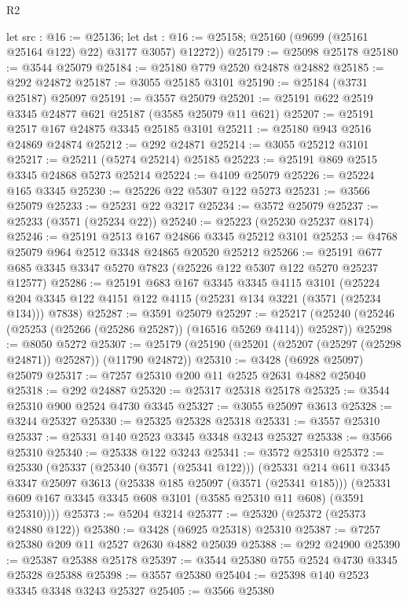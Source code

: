 \begin{lexlean}{R2}
\begin{coremodule}
        let src : @16 := @25136;
        let dst : @16 := @25158; @25160 (@9699 (@25161 @25164 @122) @22) @3177 @3057)
        @12272))
@25179 := @25098 @25178
@25180 := @3544 @25079
@25184 := @25180 @779 @2520 @24878 @24882
@25185 := @292 @24872
@25187 := @3055 @25185 @3101
@25190 := @25184 (@3731 @25187) @25097
@25191 := @3557 @25079
@25201 := @25191 @622 @2519 @3345 @24877 @621 @25187 (@3585 @25079 @11 @621)
@25207 := @25191 @2517 @167 @24875 @3345 @25185 @3101
@25211 := @25180 @943 @2516 @24869 @24874
@25212 := @292 @24871
@25214 := @3055 @25212 @3101
@25217 := @25211 (@5274 @25214) @25185
@25223 := @25191 @869 @2515 @3345 @24868 @5273 @25214
@25224 := @4109 @25079
@25226 := @25224 @165 @3345
@25230 := @25226 @22 @5307 @122 @5273
@25231 := @3566 @25079
@25233 := @25231 @22 @3217
@25234 := @3572 @25079
@25237 := @25233 (@3571 (@25234 @22))
@25240 := @25223 (@25230 @25237 @8174)
@25246 := @25191 @2513 @167 @24866 @3345 @25212 @3101
@25253 := @4768 @25079 @964 @2512 @3348 @24865 @20520 @25212
@25266 := @25191 @677 @685 @3345 @3347 @5270 @7823 (@25226 @122 @5307 @122 @5270 @25237 @12577)
@25286 := @25191
    @683
    @167
    @3345
    @3345
    @4115
    @3101
    (@25224 @204 @3345 @122 @4151 @122 @4115 (@25231 @134 @3221 (@3571 (@25234 @134))) @7838)
@25287 := @3591 @25079
@25297 := @25217 (@25240 (@25246 (@25253 (@25266 (@25286 @25287)) (@16516 @5269 @4114)) @25287))
@25298 := @8050 @5272
@25307 := @25179 (@25190 (@25201 (@25207 (@25297 (@25298 @24871)) @25287)) (@11790 @24872))
@25310 := @3428 (@6928 @25097) @25079
@25317 := @7257 @25310 @200 @11 @2525 @2631 @4882 @25040
@25318 := @292 @24887
@25320 := @25317 @25318 @25178
@25325 := @3544 @25310 @900 @2524 @4730 @3345
@25327 := @3055 @25097 @3613
@25328 := @3244 @25327
@25330 := @25325 @25328 @25318
@25331 := @3557 @25310
@25337 := @25331 @140 @2523 @3345 @3348 @3243 @25327
@25338 := @3566 @25310
@25340 := @25338 @122 @3243
@25341 := @3572 @25310
@25372 := @25330
    (@25337
      (@25340 (@3571 (@25341 @122)))
      (@25331
        @214
        @611
        @3345
        @3347
        @25097
        @3613
        (@25338 @185 @25097 (@3571 (@25341 @185)))
        (@25331 @609 @167 @3345 @3345 @608 @3101 (@3585 @25310 @11 @608) (@3591 @25310))))
@25373 := @5204 @3214
@25377 := @25320 (@25372 (@25373 @24880 @122))
@25380 := @3428 (@6925 @25318) @25310
@25387 := @7257 @25380 @209 @11 @2527 @2630 @4882 @25039
@25388 := @292 @24900
@25390 := @25387 @25388 @25178
@25397 := @3544 @25380 @755 @2524 @4730 @3345 @25328 @25388
@25398 := @3557 @25380
@25404 := @25398 @140 @2523 @3345 @3348 @3243 @25327
@25405 := @3566 @25380

\end{coremodule}
\end{lexlean}
